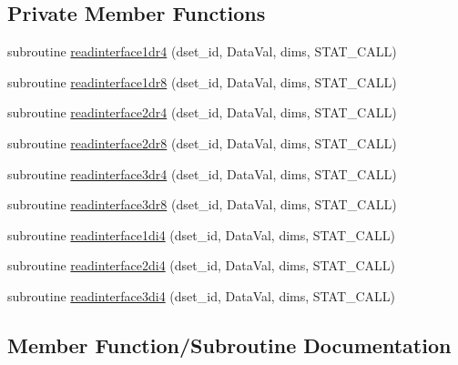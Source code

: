 \subsection*{Private Member Functions}
\begin{DoxyCompactItemize}
\item 
subroutine \mbox{\hyperlink{interfacemodulegluehdf5files_1_1readinterface_a962bffadc1439c2d76f71efe7f2f0d52}{readinterface1dr4}} (dset\+\_\+id, Data\+Val, dims, S\+T\+A\+T\+\_\+\+C\+A\+LL)
\item 
subroutine \mbox{\hyperlink{interfacemodulegluehdf5files_1_1readinterface_ae7e0f794915a72ee472f24dcc825f99a}{readinterface1dr8}} (dset\+\_\+id, Data\+Val, dims, S\+T\+A\+T\+\_\+\+C\+A\+LL)
\item 
subroutine \mbox{\hyperlink{interfacemodulegluehdf5files_1_1readinterface_a4373884420ee0383c19986206c445dd1}{readinterface2dr4}} (dset\+\_\+id, Data\+Val, dims, S\+T\+A\+T\+\_\+\+C\+A\+LL)
\item 
subroutine \mbox{\hyperlink{interfacemodulegluehdf5files_1_1readinterface_aab937c60aca44bc01fab4754c0c6cf49}{readinterface2dr8}} (dset\+\_\+id, Data\+Val, dims, S\+T\+A\+T\+\_\+\+C\+A\+LL)
\item 
subroutine \mbox{\hyperlink{interfacemodulegluehdf5files_1_1readinterface_ac78cdfc260e975f4393d59d4de8aae2d}{readinterface3dr4}} (dset\+\_\+id, Data\+Val, dims, S\+T\+A\+T\+\_\+\+C\+A\+LL)
\item 
subroutine \mbox{\hyperlink{interfacemodulegluehdf5files_1_1readinterface_acc31aac7a89379268183c9337f550043}{readinterface3dr8}} (dset\+\_\+id, Data\+Val, dims, S\+T\+A\+T\+\_\+\+C\+A\+LL)
\item 
subroutine \mbox{\hyperlink{interfacemodulegluehdf5files_1_1readinterface_aa890269135ee6cc1425d941baaf065e8}{readinterface1di4}} (dset\+\_\+id, Data\+Val, dims, S\+T\+A\+T\+\_\+\+C\+A\+LL)
\item 
subroutine \mbox{\hyperlink{interfacemodulegluehdf5files_1_1readinterface_a23373e04b343bf506f88f4250ddb3653}{readinterface2di4}} (dset\+\_\+id, Data\+Val, dims, S\+T\+A\+T\+\_\+\+C\+A\+LL)
\item 
subroutine \mbox{\hyperlink{interfacemodulegluehdf5files_1_1readinterface_a04d361115aaedde27b5b75207239b499}{readinterface3di4}} (dset\+\_\+id, Data\+Val, dims, S\+T\+A\+T\+\_\+\+C\+A\+LL)
\end{DoxyCompactItemize}


\subsection{Member Function/\+Subroutine Documentation}
\mbox{\label{interfacemodulegluehdf5files_1_1readinterface_aa890269135ee6cc1425d941baaf065e8}} 
